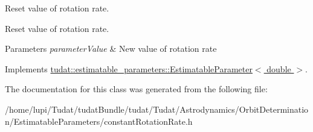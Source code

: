 Reset value of rotation rate. 

Reset value of rotation rate. 
\begin{DoxyParams}{Parameters}
{\em parameter\+Value} & New value of rotation rate \\
\hline
\end{DoxyParams}


Implements \hyperlink{classtudat_1_1estimatable__parameters_1_1EstimatableParameter_a5df35bde257a6db401ca3c3613056554}{tudat\+::estimatable\+\_\+parameters\+::\+Estimatable\+Parameter$<$ double $>$}.



The documentation for this class was generated from the following file\+:\begin{DoxyCompactItemize}
\item 
/home/lupi/\+Tudat/tudat\+Bundle/tudat/\+Tudat/\+Astrodynamics/\+Orbit\+Determination/\+Estimatable\+Parameters/constant\+Rotation\+Rate.\+h\end{DoxyCompactItemize}
